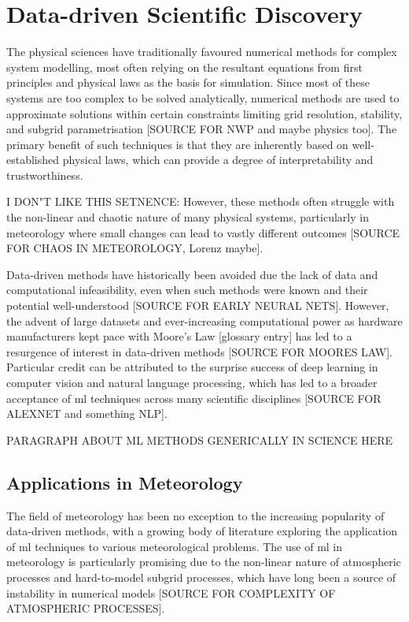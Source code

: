 \section{Data-driven Scientific Discovery}

The physical sciences have traditionally favoured numerical methods for complex system modelling, most often relying on the resultant equations from first principles and physical laws as the basis for simulation. Since most of these systems are too complex to be solved analytically, numerical methods are used to approximate solutions within certain constraints limiting grid resolution, stability, and subgrid parametrisation [SOURCE FOR NWP and maybe physics too]. The primary benefit of such techniques is that they are inherently based on well-established physical laws, which can provide a degree of interpretability and trustworthiness. 

I DON"T LIKE THIS SETNENCE: However, these methods often struggle with the non-linear and chaotic nature of many physical systems, particularly in meteorology where small changes can lead to vastly different outcomes [SOURCE FOR CHAOS IN METEOROLOGY, Lorenz maybe].

 Data-driven methods have historically been avoided due the lack of data and computational infeasibility, even when such methods were known and their potential well-understood [SOURCE FOR EARLY NEURAL NETS]. However, the advent of large datasets and ever-increasing computational power as hardware manufacturers kept pace with Moore's Law [glossary entry] has led to a resurgence of interest in data-driven methods [SOURCE FOR MOORES LAW]. Particular credit can be attributed to the surprise success of deep learning in computer vision and natural language processing, which has led to a broader acceptance of \acrfull{ml} techniques across many scientific disciplines [SOURCE FOR ALEXNET and something NLP].

 PARAGRAPH ABOUT ML METHODS GENERICALLY IN SCIENCE HERE

\subsection{Applications in Meteorology}

The field of meteorology has been no exception to the increasing popularity of data-driven methods, with a growing body of literature exploring the application of \acrshort{ml} techniques to various meteorological problems. The use of \acrshort{ml} in meteorology is particularly promising due to the non-linear nature of atmospheric processes and  hard-to-model subgrid processes, which have long been a source of instability in numerical models [SOURCE FOR COMPLEXITY OF ATMOSPHERIC PROCESSES].

